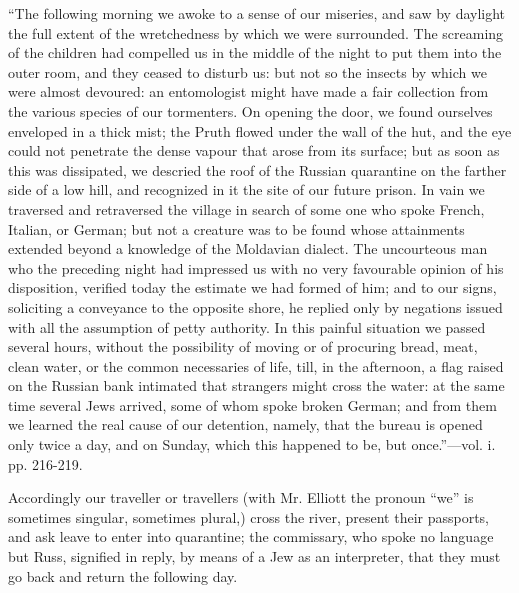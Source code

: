 ``The
following morning we awoke to a sense of our miseries, and saw by
daylight the full extent of the wretchedness by which we were
surrounded. The screaming of the children had compelled us in the middle
of the night to put them into the outer room, and they ceased to disturb
us: but not so the insects by which we were almost devoured: an
entomologist might have made a fair collection from the various species
of our tormenters. On opening the door, we found ourselves enveloped in
a thick mist; the Pruth flowed under the wall of the hut, and the eye
could not penetrate the dense vapour that arose from its surface; but as
soon as this was dissipated, we descried the roof of the Russian
quarantine on the farther side of a low hill, and recognized in it the
site of our future prison. In vain we traversed and retraversed the
village in search of some one who spoke French, Italian, or German; but
not a creature was to be found whose attainments extended beyond a
knowledge of the Moldavian dialect. The uncourteous man who the
preceding night had impressed us with no very favourable opinion of his
disposition, verified today the estimate we had formed of him; and to
our signs, soliciting a conveyance to the opposite shore, he replied
only by negations issued with all the assumption of petty authority. In
this painful situation we passed several hours, without the possibility
of moving or of procuring bread, meat, clean water, or the common
necessaries of life, till, in the afternoon, a flag raised on the
Russian bank intimated that strangers might cross the water: at the same
time several Jews arrived, some of whom spoke broken German; and from
them we learned the real cause of our detention, namely, that the bureau
is opened only twice a day, and on Sunday, which this happened to be,
but once.''—vol. i. pp. 216-219.

Accordingly
our traveller or travellers (with Mr. Elliott the pronoun ``we'' is
sometimes singular, sometimes plural,) cross the river, present their
passports, and ask leave to enter into quarantine; the commissary, who
spoke no language but Russ, signified in reply, by means of a Jew
as an interpreter, that they must go back and return the following day.

